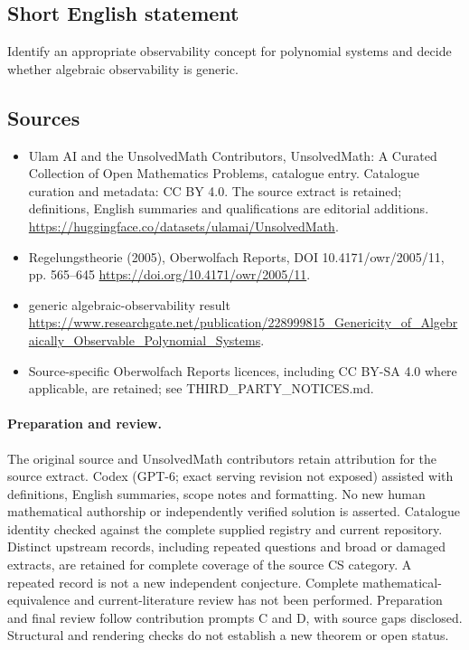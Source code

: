 \documentclass[11pt]{article}
\begin{document}
\subsection{Short English statement}
Identify an appropriate observability concept for polynomial systems and decide whether algebraic observability is generic.
\subsection{Sources}
\begin{itemize}
\item[\hypertarget{source:statement:1}{S1}] Ulam AI and the UnsolvedMath Contributors, UnsolvedMath: A Curated Collection of Open Mathematics Problems, catalogue entry. Catalogue curation and metadata: CC BY 4.0. The source extract is retained; definitions, English summaries and qualifications are editorial additions.
\url{https://huggingface.co/datasets/ulamai/UnsolvedMath}.
\item[\hypertarget{source:statement:2}{S2}] Regelungstheorie (2005), Oberwolfach Reports, DOI 10.4171/owr/2005/11, pp. 565--645
\url{https://doi.org/10.4171/owr/2005/11}.
\item[\hypertarget{source:statement:3}{S3}] generic algebraic-observability result
\url{https://www.researchgate.net/publication/228999815_Genericity_of_Algebraically_Observable_Polynomial_Systems}.
\item Source-specific Oberwolfach Reports licences, including CC BY-SA 4.0 where applicable, are retained; see THIRD\_PARTY\_NOTICES.md.
\end{itemize}
\paragraph{Preparation and review.}
The original source and UnsolvedMath contributors retain attribution for the source extract. Codex (GPT-6; exact serving revision not exposed) assisted with definitions, English summaries, scope notes and formatting. No new human mathematical authorship or independently verified solution is asserted. Catalogue identity checked against the complete supplied registry and current repository. Distinct upstream records, including repeated questions and broad or damaged extracts, are retained for complete coverage of the source CS category. A repeated record is not a new independent conjecture. Complete mathematical-equivalence and current-literature review has not been performed. Preparation and final review follow contribution prompts C and D, with source gaps disclosed. Structural and rendering checks do not establish a new theorem or open status.
\label{end:statement}
\end{document}
